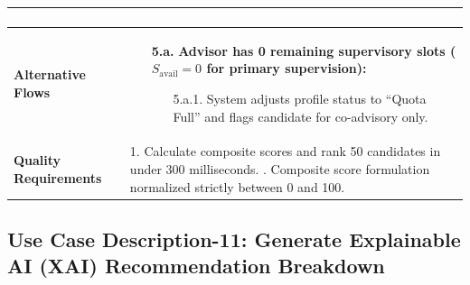 \begin{table}[H]
\begin{tabularx}{\textwidth}{|l|X|}
\begin{enumerate}[leftmargin=*]
\end{enumerate} \\ \hline
\textbf{Alternative Flows} &
\begin{itemize}[leftmargin=*]
    \item[\textbf{5.a.}] \textbf{Advisor has 0 remaining supervisory slots ($S_{\text{avail}} = 0$ for primary supervision):}
    \begin{itemize}[leftmargin=*]
        \item[5.a.1.] System adjusts profile status to ``Quota Full'' and flags candidate for co-advisory only.
    \end{itemize}
\end{itemize} \\ \hline
\textbf{Quality Requirements} & 
1. Calculate composite scores and rank 50 candidates in under 300 milliseconds. \newline
2. Composite score formulation normalized strictly between 0 and 100. \\ \hline
\end{tabularx}
\end{table}

\clearpage
\subsection{Use Case Description-11: Generate Explainable AI (XAI) Recommendation Breakdown}
\label{subsec:uc11}

